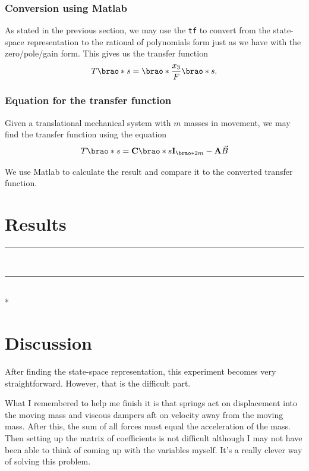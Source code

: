 \documentclass[12pt]{article}
\DeclarePairedDelimiter\brao()%
\def\hr{{\par\noindent\rule{\textwidth}{0.4pt}}}
\begin{document}
\subsubsection{Conversion using Matlab}

As stated in the previous section,
we may use the \texttt{tf} to convert from the state-space representation to the rational of polynomials form
just as we have with the zero/pole/gain form.
This gives us the transfer function
\begin{equation}
    T\brao*s = \brao*{\frac{x_3}{F}}\brao*s.
\end{equation}

\subsubsection{Equation for the transfer function}

Given a translational mechanical system with $m$ masses in movement,
we may find the transfer function using the equation
\begin{equation}
    T\brao*s = \mathbf{C}\brao*{s\mathbf{I}_{\brao*{2m}} - \mathbf{A}}\vec{B}
\end{equation}

We use Matlab to calculate the result and compare it to the converted transfer function.

\section{Results}

\hr



\ \hr \\*



\section{Discussion}

After finding the state-space representation,
this experiment becomes very straightforward.
However, that is the difficult part.

What I remembered to help me finish it is that springs act on displacement into the moving mass and viscous dampers aft on velocity away from the moving mass.
After this, the sum of all forces must equal the acceleration of the mass.
Then setting up the matrix of coefficients is not difficult although I may not have been able to think of coming up with the variables myself.
It's a really clever way of solving this problem.
\end{document}
